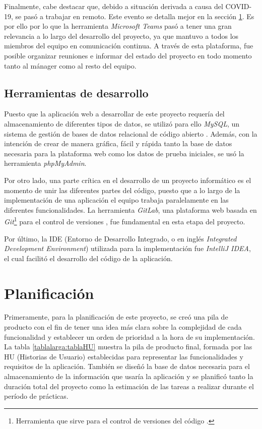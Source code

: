 \documentclass[pdftex,11pt,a4paper]{book}
\begin{document}
Finalmente, cabe destacar que, debido a situación derivada a causa del COVID-19, se pasó a trabajar en remoto. Este evento se detalla mejor en la sección \ref{seccion:planificacion}. Es por ello por lo que la herramienta \textit{Microsoft Teams} pasó a tener una gran relevancia a lo largo del desarrollo del proyecto, ya que mantuvo a todos los miembros del equipo en comunicación continua. A través de esta plataforma, fue posible organizar reuniones e informar del estado del proyecto en todo momento tanto al mánager como al resto del equipo.

\subsection{Herramientas de desarrollo}

Puesto que la aplicación web a desarrollar de este proyecto requería del almacenamiento de diferentes tipos de datos, se utilizó para ello \textit{MySQL}, un sistema de gestión de bases de datos relacional de código abierto \cite{bib:mysql}. Además, con la intención de crear de manera gráfica, fácil y rápida tanto la base de datos necesaria para la plataforma web como los datos de prueba iniciales, se usó la herramienta \textit{phpMyAdmin}.

Por otro lado, una parte crítica en el desarrollo de un proyecto informático es el momento de unir las diferentes partes del código, puesto que a lo largo de la implementación de una aplicación el equipo trabaja paralelamente en las diferentes funcionalidades. La herramienta \textit{GitLab}, una plataforma web basada en \textit{Git}\footnote{Herramienta que sirve para el control de versiones del código \cite{bib:git}.} para el control de versiones \cite{bib:gitlab}, fue fundamental en esta etapa del proyecto.

Por último, la IDE (Entorno de Desarrollo Integrado, o en inglés \textit{Integrated Development Environment}) utilizada para la implementación fue \textit{IntelliJ IDEA}, el cual facilitó el desarrollo del código de la aplicación. 

\section{Planificación} \label{seccion:planificacion}

Primeramente, para la planificación de este proyecto, se creó una pila de producto con el fin de tener una idea más clara sobre la complejidad de cada funcionalidad y establecer un orden de prioridad a la hora de su implementación. La tabla \ref{tablalarga:tablaHU} muestra la pila de producto final, formada por las HU (Historias de Usuario) establecidas para representar las funcionalidades y requisitos de la aplicación. También se diseñó la base de datos necesaria para el almacenamiento de la información que usaría la aplicación y se planificó tanto la duración total del proyecto como la estimación de las tareas a realizar durante el período de prácticas.
\end{document}
